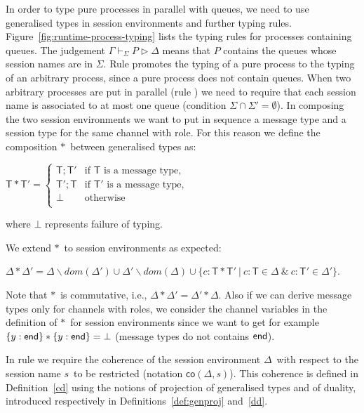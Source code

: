 \documentclass{LMCS}
\newcommand{\kf}[1]{\textup{\textsf{#1}}\xspace}
\newcommand{\ccc}{\ensuremath{c}}
\newcommand{\s}{\ensuremath{s}}
\newcommand{\set}[1]{\ensuremath{\{#1\}}}
\newcommand{\sep}{\ensuremath{~\mathbf{|}~ }}
\newcommand{\Ga}{\ensuremath{\Gamma}}
\newcommand{\D}{\ensuremath{\Delta}}
\newcommand{\TG}{\ensuremath{{\mathsf{T}}}}
\newcommand{\dom}[1]{\ensuremath{dom( #1)}}
\newcommand{\End}{\kf{end}}
\newcommand{\trule}[1]{\text{\footnotesize{\ensuremath{\lfloor\text{\sc{#1}}\rfloor}}}}
\newcommand{\derqq}[4]{\ensuremath{#1 \vdash_{#2} #3 \triangleright #4}}
\newcommand{\coe}[2]{\ensuremath{\mathsf{co}({#1},{#2})}}
\newcommand{\Dcomp}{\ensuremath{\ast}}
\newcommand{\Tcomp}{\ensuremath{;}}
\newcommand{\PP}{\ensuremath{P}}
\begin{document}
In order to type pure processes in parallel with queues,
we need to use generalised types in session environments and
further typing rules. Figure~\ref{fig:runtime-process-typing}
lists the typing rules for processes containing queues.
The judgement $\derqq{\Ga}{\Sigma}{\PP}{\D}$ means that
$\PP$ contains the queues whose session names are in $\Sigma$.
Rule \trule{GInit} promotes the typing of a pure process
to the typing of an arbitrary process, since a pure process does not
contain queues. When two arbitrary processes are put in parallel (rule
\trule{GPar}) we need to require that each session name is associated
to at most one queue (condition $\Sigma\cap\Sigma'=\emptyset$). In
composing the two session environments we want to put in sequence a
message type and a session type for the same channel with role. 
For this reason we define the composition \Dcomp\ between 
generalised types as:

\begin{center}
$\TG \Dcomp \TG'=\begin{cases}
  \TG \Tcomp \TG'    & \text{if $\TG$ is a message type}, \\[-.2em]
    \TG'\Tcomp \TG   & \text{if $\TG'$ is a message type}, \\[-.2em]
    \bot  & \text{otherwise}\\
\end{cases}$
\end{center}

\noindent
where $\bot$ represents failure of typing.

We extend \Dcomp\ to session environments as expected:

\begin{center}
$\D \Dcomp \D' = \D\backslash \dom{\D'} \cup \D' \backslash \dom{\D}
\cup \set{\ccc: \TG \Dcomp \TG' \sep
  \ccc:\TG \in \D~\&~\ccc:\TG' \in \D'}$.
\end{center}

\noindent Note that \Dcomp\ is commutative, i.e., $\D \Dcomp
\D'=\D' \Dcomp \D$. Also if we can derive message types only for
channels with roles, we consider the channel variables in the
definition of \Dcomp\ for session environments since we want to
get for example $\set{y:\End}\Dcomp\set{y:\End}=\bot$ (message
types do not contains $\End$). 




In rule \trule{GSRes} we require the coherence of the session 
environment \D\ with respect to the session name \s\
to be restricted (notation \coe\D\s). This coherence 
is defined in Definition~\ref{cd} using the notions of projection 
of generalised types and of duality, 
introduced respectively in Definitions~\ref{def:genproj} and~\ref{dd}. 
\end{document}

